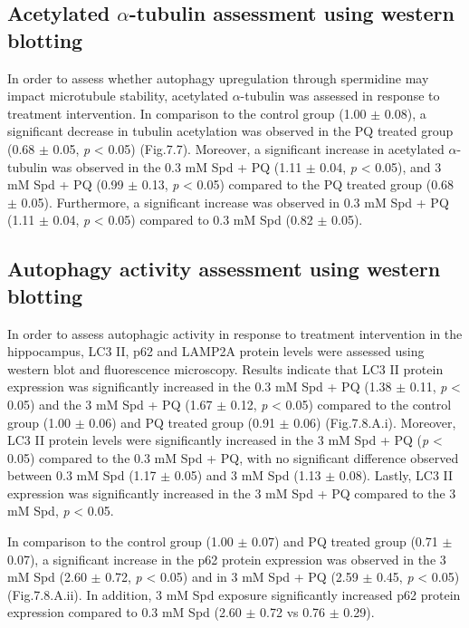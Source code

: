 \subsection{Acetylated $\alpha$-tubulin assessment using western blotting}
In order to assess whether autophagy upregulation through spermidine may impact microtubule stability, acetylated $\alpha$-tubulin was assessed in response to treatment intervention. In comparison to the control group (1.00 $\pm$ 0.08), a significant decrease in tubulin acetylation was observed in the PQ treated group (0.68 $\pm$ 0.05, \textit{p} < 0.05) (Fig.7.7). Moreover, a significant increase in acetylated $\alpha$-tubulin was observed in the 0.3 mM Spd + PQ (1.11 $\pm$ 0.04, \textit{p} < 0.05), and 3 mM Spd + PQ (0.99 $\pm$ 0.13, \textit{p} < 0.05) compared to the PQ treated group (0.68 $\pm$ 0.05). Furthermore, a significant increase was observed in 0.3 mM Spd + PQ (1.11 $\pm$ 0.04, \textit{p} < 0.05) compared to 0.3 mM Spd (0.82 $\pm$ 0.05).


\subsection{Autophagy activity assessment using western blotting}
In order to assess autophagic activity in response to treatment intervention in the hippocampus, LC3 II, p62 and LAMP2A protein levels were assessed using western blot and fluorescence microscopy. Results indicate that LC3 II protein expression was significantly increased in the 0.3 mM Spd + PQ (1.38 $\pm$ 0.11, \textit{p} < 0.05) and the 3 mM Spd + PQ (1.67 $\pm$ 0.12, \textit{p} < 0.05) compared to the control group (1.00 $\pm$ 0.06) and PQ treated group (0.91 $\pm$ 0.06) (Fig.7.8.A.i). Moreover, LC3 II protein levels were significantly increased in the 3 mM Spd + PQ (\textit{p} < 0.05) compared to the 0.3 mM Spd + PQ, with no significant difference observed between 0.3 mM Spd (1.17 $\pm$ 0.05) and 3 mM Spd (1.13 $\pm$ 0.08). Lastly, LC3 II expression was significantly increased in the 3 mM Spd + PQ compared to the 3 mM Spd, \textit{p} < 0.05.

In comparison to the control group (1.00 $\pm$ 0.07) and PQ treated group (0.71 $\pm$ 0.07), a significant increase in the p62 protein expression was observed in the 3 mM Spd (2.60 $\pm$ 0.72, \textit{p} < 0.05) and in 3 mM Spd + PQ (2.59 $\pm$ 0.45, \textit{p} < 0.05) (Fig.7.8.A.ii). In addition, 3 mM Spd exposure significantly increased p62 protein expression compared to 0.3 mM Spd (2.60 $\pm$ 0.72 vs 0.76 $\pm$ 0.29).

